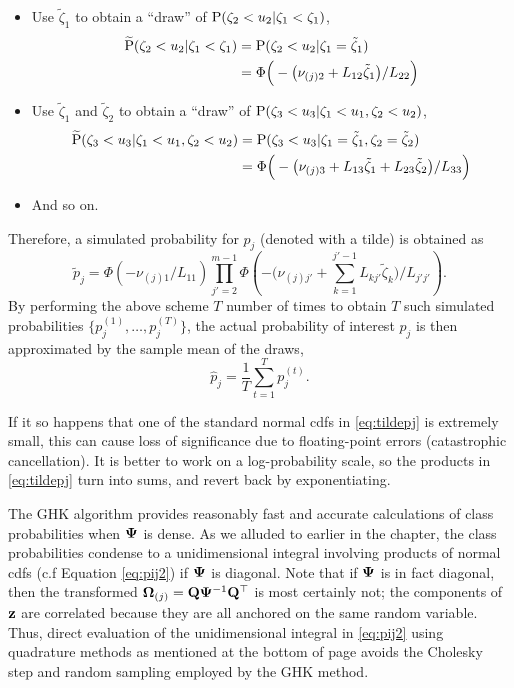 \begin{itemize}
  \item Use $\tilde\zeta_1$ to obtain a ``draw'' of $\operatorname{P}(\zeta_2 < u_2|\zeta_1 < \zeta_1)$,
  \begin{align*}
    \widetilde{\operatorname{P}}(\zeta_2 < u_2|\zeta_1 < \zeta_1)
    &=\operatorname{P}(\zeta_2 < u_2|\zeta_1 = \tilde\zeta_1) \\
    &= \Phi \Big( - \big(\nu_{(j)2} +  L_{12}\tilde\zeta_1 \big) / L_{22} \Big)
  \end{align*}
  \item Use $\tilde\zeta_1$ and $\tilde\zeta_2$ to obtain a ``draw'' of $\operatorname{P}(\zeta_3 < u_3|\zeta_1 < u_1,\zeta_2 < u_2)$,
  \begin{align*}
    \widetilde{\operatorname{P}}(\zeta_3 < u_3|\zeta_1 < u_1,\zeta_2 < u_2)
    &=\operatorname{P}(\zeta_3 < u_3|\zeta_1 = \tilde\zeta_1,\zeta_2 = \tilde\zeta_2)\\
    &= \Phi \Big( - \big(\nu_{(j)3} + L_{13}\tilde\zeta_1 + L_{23}\tilde\zeta_2 \big) / L_{33} \Big)
  \end{align*} 
  \item And so on. 
\end{itemize}
Therefore, a simulated probability for $p_j$ (denoted with a tilde) is obtained as
\begin{equation}\label{eq:tildepj}
  \tilde p_j = \Phi\left( -\nu_{(j)1}/ L_{11} \right) 
  \prod_{j'=2}^{m-1} \Phi \left( 
  - \big(\nu_{(j)j'} + \textstyle\sum_{k=1}^{j'-1} L_{kj'}\tilde\zeta_k \big) / L_{j'j'} 
  \right).
\end{equation}
By performing the above scheme $T$ number of times to obtain $T$ such simulated probabilities $\{p_j^{(1)},\dots,p_j^{(T)} \}$, the actual probability of interest $p_j$ is then approximated by the sample mean of the draws,
\[
  \hat p_j = \frac{1}{T} \sum_{t=1}^T p_j^{(t)}.
\]

If it so happens that one of the standard normal cdfs in \cref{eq:tildepj} is extremely small, this can cause loss of significance due to floating-point errors (catastrophic cancellation).
It is better to work on a log-probability scale, so the products in \cref{eq:tildepj} turn into sums, and revert back by exponentiating.

\begin{remark}
  The GHK algorithm provides reasonably fast and accurate calculations of class probabilities when ${\bm\Psi}$ is dense.
  As we alluded to earlier in the chapter, the class probabilities condense to a unidimensional integral involving products of normal cdfs (c.f {\color{\mycitecolour}Equation} \ref{eq:pij2}) if ${\bm\Psi}$ is diagonal.
  Note that if ${\bm\Psi}$ is in fact diagonal, then the transformed ${\bm\Omega}_{(j)} = {\mathbf Q}{\bm\Psi}^{-1}{\mathbf Q}^\top$ is most certainly not; the components of ${\mathbf z}$ are  correlated because they are all anchored on the same random variable.
  Thus, direct evaluation of the unidimensional integral in \cref{eq:pij2} using quadrature methods as mentioned at the bottom of {\color{\mycitecolour}page} \pageref{eq:pij2} avoids the Cholesky step and random sampling employed by the GHK method.
\end{remark}

